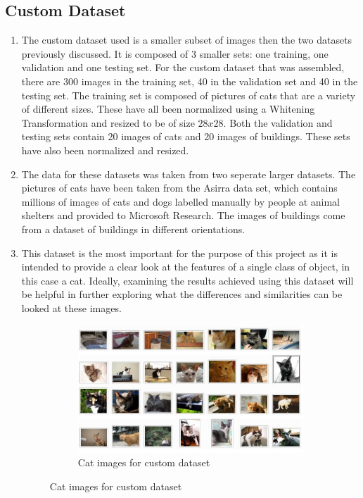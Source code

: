 \documentclass[12pt, titlepage]{article}
\begin{document}
\subsection{Custom Dataset}

\begin{enumerate}
  \item The custom dataset used is a smaller subset of images then the two datasets previously
  		discussed. It is composed of 3 smaller sets: one training, one validation and one testing
  		set. For the custom dataset that was assembled, there are 300 images in the training set, 40 in the
  		validation set and 40 in the testing set. The training set is composed of pictures of cats that are
  		a variety of different sizes. These have all been normalized using a Whitening Transformation and 
  		resized to be of size $28x28$. Both the validation and testing sets contain 20 images of cats and 20
  		images of buildings. These sets have also been normalized and resized. 
  		
  \item The data for these datasets was taken from two seperate larger datasets. The pictures of cats have been
  		taken from the Asirra data set, which contains millions of images of cats and dogs labelled manually
  		by people at animal shelters and provided to Microsoft Research. The images of buildings come from 
  		a dataset of buildings in different orientations.
  \item This dataset is the most important for the purpose of this project as it is intended to provide a
  		clear look at the features of a single class of object, in this case a cat. Ideally, examining the
  		results achieved using this dataset will be helpful in further exploring what the differences and
  		similarities can be looked at these images.
  		\FloatBarrier
        \begin{figure}[h]
          \centering
          \begin{subfigure}{\textwidth}
            \centering
            \caption{Cat images for custom dataset}
            \includegraphics[scale=0.4]{images/custom_dataset_example}
          \end{subfigure}
        \end{figure}
        \FloatBarrier
\end{enumerate}
\end{document}
